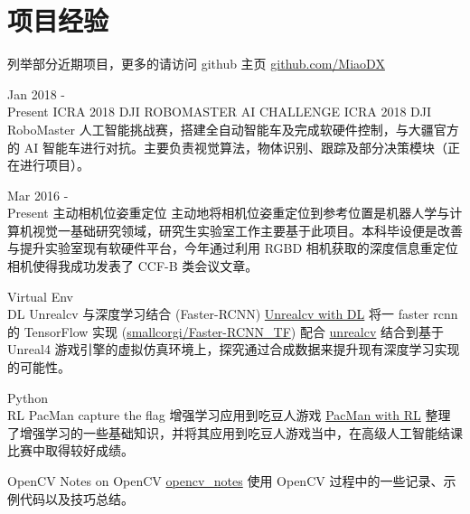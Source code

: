 \documentclass[utf8]{twentysecondcv} %
\begin{document}
\section{项目经验}
\begin{twenty}

    \twentyitem
        {}
        {列举部分近期项目，更多的请访问 github 主页}
        {\href{https://github.com/MiaoDX/}{github.com/MiaoDX}}
        {}
        {}
          
    \twentyitem
    {Jan 2018 - \\ Present}
    {ICRA 2018 DJI ROBOMASTER AI CHALLENGE}
    {}
    {}
    {ICRA 2018 DJI RoboMaster 人工智能挑战赛，搭建全自动智能车及完成软硬件控制，与大疆官方的 AI 智能车进行对抗。主要负责视觉算法，物体识别、跟踪及部分决策模块（正在进行项目）。}              
          

    \twentyitem
    {Mar 2016 - \\ Present}
    {主动相机位姿重定位}
    {}
    {}
    {主动地将相机位姿重定位到参考位置是机器人学与计算机视觉一基础研究领域，研究生实验室工作主要基于此项目。本科毕设便是改善与提升实验室现有软硬件平台，今年通过利用 RGBD 相机获取的深度信息重定位相机使得我成功发表了 CCF-B 类会议文章。}
          
    \twentyitem
        {Virtual Env \\ DL}
        {Unrealcv 与深度学习结合 (Faster-RCNN)}
        {\href{https://github.com/MiaoDX/unrealcv_examples/}{Unrealcv with DL}}
        {}
        {将一 faster rcnn 的 TensorFlow 实现 (\href{https://github.com/smallcorgi/Faster-RCNN\_TF}{smallcorgi/Faster-RCNN\_TF}) 配合 \href{https://github.com/unrealcv/unrealcv}{unrealcv} 结合到基于 Unreal4 游戏引擎的虚拟仿真环境上，探究通过合成数据来提升现有深度学习实现的可能性。}
                 
    \twentyitem
        {Python \\ RL}
        {PacMan capture the flag 增强学习应用到吃豆人游戏}
        {\href{https://github.com/MiaoDX/hand_in_homework/tree/master/Advanced\_AI/}{PacMan with RL}}
        {}
        {整理了增强学习的一些基础知识，并将其应用到吃豆人游戏当中，在高级人工智能结课比赛中取得较好成绩。}
   
    \twentyitem
        {OpenCV}
        {Notes on OpenCV}
        {\href{https://github.com/MiaoDX/opencv\_projects/}{opencv\_notes}}
        {}
        {使用 OpenCV 过程中的一些记录、示例代码以及技巧总结。}

\end{twenty}
\end{document}

